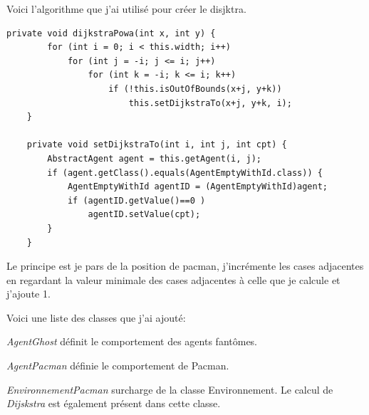 \documentclass[a4paper,12pt]{report}
\begin{document}
Voici l'algorithme que j'ai utilisé pour créer le disjktra.

\begin{lstlisting}[style=Java]
	private void dijkstraPowa(int x, int y) {	
		for (int i = 0; i < this.width; i++) 
			for (int j = -i; j <= i; j++)
				for (int k = -i; k <= i; k++)
					if (!this.isOutOfBounds(x+j, y+k)) 
						this.setDijkstraTo(x+j, y+k, i);
	}					

	private void setDijkstraTo(int i, int j, int cpt) {
		AbstractAgent agent = this.getAgent(i, j);
		if (agent.getClass().equals(AgentEmptyWithId.class)) {
			AgentEmptyWithId agentID = (AgentEmptyWithId)agent;
			if (agentID.getValue()==0 ) 
				agentID.setValue(cpt);
		}		
	}
\end{lstlisting}

Le principe est je pars de la position de pacman, j'incrémente les cases adjacentes en regardant la valeur minimale des cases adjacentes à celle que je calcule et j'ajoute 1.

Voici une liste des classes que j'ai ajouté:

\textit{AgentGhost} définit le comportement des agents fantômes.

\textit{AgentPacman} définie le comportement de Pacman.

\textit{EnvironnementPacman} surcharge de la classe Environnement. Le calcul de \textit{Dijskstra} est également présent dans cette classe.
\end{document}
